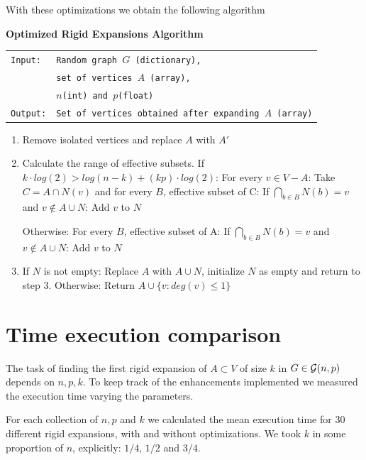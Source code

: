 With these optimizations we obtain the following algorithm

\begin{cajita}
\textbf{Optimized Rigid Expansions Algorithm} \hfill \break

\begin{tabular}{ l l }
\texttt{Input:} &  \texttt{Random graph $G$ (dictionary),} \\
                &  \texttt{set of vertices $A$ (array),} \\
                &  \texttt{$n$(int) and $p$(float)} \\
\texttt{Output:} & \texttt{Set of vertices obtained after expanding $A$ (array)} \\
\end{tabular}
\begin{enumerate}
\item Remove isolated vertices and replace $A$ with $A'$
\item Calculate the range of effective subsets.\hfill \break
If $k\cdot log(2) > log(n-k) + (kp)\cdot log(2)$: \hfill \break
\hphantom{12} For every $v\in V-A$:\hfill \break
\hphantom{1234} Take $C = A\cap N(v)$ and for every $B$, effective subset of C:\hfill \break
\hphantom{123456} If $\bigcap\limits_{b\in B} N(b) = v$ and $v\not\in A\cup N$: \hfill \break
\hphantom{12341234} Add $v$ to $N$

Otherwise:\hfill \break
\hphantom{12} For every $B$, effective subset of A:\hfill \break
\hphantom{1234} If $\bigcap\limits_{b\in B} N(b) = v$ and $v\not\in A\cup N$: \hfill \break
\hphantom{123456} Add $v$ to $N$

\item If $N$ is not empty: \hfill \break
\hphantom{12} Replace $A$ with $A\cup N$, initialize $N$ as empty and return to step 3. \hfill \break
      Otherwise:\hfill \break
\hphantom{12} Return $A\cup\{v: deg(v)\leq 1 \}$
\end{enumerate}
\end{cajita}

\section{Time execution comparison}
The task of finding the first rigid expansion of $A\subset V$ of size $k$ in $G\in\mathcal{G}(n,p)$ depends on $n,p,k$. To keep track of the enhancements implemented we measured the execution time varying the parameters.

For each collection of $n, p$ and $k$ we calculated the mean execution time for 30 different rigid expansions, with and without optimizations. We took $k$ in some proportion of $n$, explicitly: $1/4$, $1/2$ and $3/4$. 

